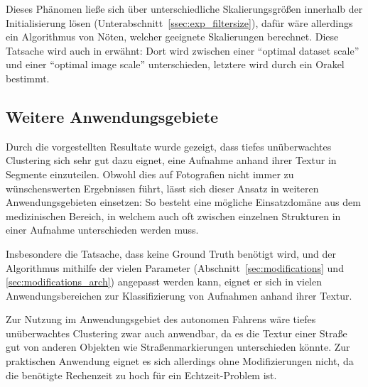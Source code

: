 Dieses Phänomen ließe sich über unterschiedliche Skalierungsgrößen innerhalb der Initialisierung lösen (\vgl Unterabschnitt~\ref{ssec:exp_filtersize}), dafür wäre allerdings ein Algorithmus von Nöten, welcher geeignete Skalierungen berechnet. Diese Tatsache wird auch in \cite{arbelaez_10} erwähnt: Dort wird zwischen einer \enquote{optimal dataset scale} und einer \enquote{optimal image scale} unterschieden, letztere wird durch ein Orakel bestimmt.

\subsection{Weitere Anwendungsgebiete}

Durch die vorgestellten Resultate wurde gezeigt, dass tiefes unüberwachtes Clustering sich sehr gut dazu eignet, eine Aufnahme anhand ihrer Textur in Segmente einzuteilen. Obwohl dies auf Fotografien nicht immer zu wünschenswerten Ergebnissen führt, lässt sich dieser Ansatz in weiteren Anwendungsgebieten einsetzen: So besteht eine mögliche Einsatzdomäne aus dem medizinischen Bereich, in welchem auch oft zwischen einzelnen Strukturen in einer Aufnahme unterschieden werden muss.

Insbesondere die Tatsache, dass keine Ground Truth benötigt wird, und der Algorithmus mithilfe der vielen Parameter (\vgl Abschnitt~\ref{sec:modifications} und \ref{sec:modifications_arch}) angepasst werden kann, eignet er sich in vielen Anwendungsbereichen zur Klassifizierung von Aufnahmen anhand ihrer Textur.

Zur Nutzung im Anwendungsgebiet des autonomen Fahrens wäre tiefes unüberwachtes Clustering zwar auch anwendbar, da es \bspw die Textur einer Straße gut von anderen Objekten wie Straßenmarkierungen unterschieden könnte. Zur praktischen Anwendung eignet es sich allerdings ohne Modifizierungen nicht, da die benötigte Rechenzeit zu hoch für ein Echtzeit-Problem ist.
